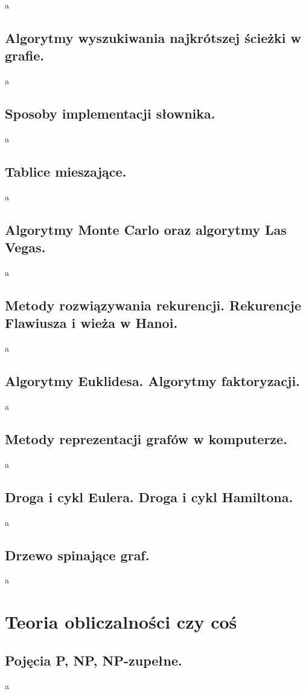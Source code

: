 \documentclass[a4paper,12pt,oneside]{book}
\begin{document}
				a
			\newpage\subsection{\color{red}Algorytmy wyszukiwania najkrótszej ścieżki w grafie.}
				a
			\newpage\subsection{\color{red}Sposoby implementacji słownika.}
				a
			\newpage\subsection{\color{red}Tablice mieszające.}
				a
			\newpage\subsection{\color{red}Algorytmy Monte Carlo oraz algorytmy Las Vegas.}
				a
			\newpage\subsection{\color{red}Metody rozwiązywania rekurencji. Rekurencje Flawiusza i wieża w Hanoi.}
				a
			\newpage\subsection{\color{red}Algorytmy Euklidesa. Algorytmy faktoryzacji.}
				a
			\newpage\subsection{\color{red}Metody reprezentacji grafów w komputerze.}
				a
			\newpage\subsection{\color{red}Droga i cykl Eulera. Droga i cykl Hamiltona.}
				a
			\newpage\subsection{\color{red}Drzewo spinające graf.}
				a
		
		\newpage\section{Teoria obliczalności czy coś}
			\subsection{\color{red}Pojęcia P, NP, NP-zupełne.}
				a
		
\end{document}
